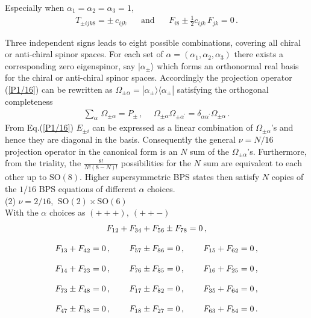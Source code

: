 \documentclass[a4paper,11pt]{article}
\begin{document}
Especially when $\alpha_{1}=\alpha_{2}=\alpha_{3}=1$,
\begin{equation}
\begin{array}{ccc}
T_{\pm ijk8}=\pm\,c_{ijk}~~~&~\mbox{and}~&~~~F_{i8}\pm\frac{1}{2}c_{ijk}\,F_{jk}=0\,.
\end{array}
\label{+++oct}
\end{equation}


Three independent signs leads to eight possible combinations, covering all chiral or anti-chiral spinor  spaces. For each set of
$\alpha=(\alpha_{1},\alpha_{2},\alpha_{3})$ there exists a corresponding zero eigenspinor, say $|\alpha_{\pm}\rangle$ which forms an orthonormal real
basis for the chiral or anti-chiral spinor spaces. Accordingly  the projection operator (\ref{P1/16})  can be rewritten as
$\Omega_{\pm\alpha}=|\alpha_{\pm}\rangle\langle\alpha_{\pm}|$ satisfying the orthogonal completeness
\begin{equation}
\begin{array}{cc}
\displaystyle{\sum_{\alpha}}\,\Omega_{\pm\alpha}=P_{\pm}\,,~&~
\Omega_{\pm\alpha}\Omega_{\pm\alpha^{\prime}}=\delta_{\alpha\alpha^{\prime}}\Omega_{\pm\alpha}\,.
\end{array}
\end{equation}
From Eq.(\ref{P1/16})  $E_{\pm i}$ can be expressed as a linear combination of $\Omega_{\pm\alpha}$'s and hence they are  diagonal in the basis.
Consequently the general $\nu={N/16}$ projection operator in the canonical form is an $N$ sum of the $\Omega_{\pm\alpha}$'s.  Furthermore, from the
triality,  the $\frac{8!}{N!(8-N)!}$ possibilities for the $N$ sum are equivalent to each other up to $\mbox{SO}(8)$. Higher supersymmetric BPS
states then satisfy $N$ copies of the ${1/16}$ BPS equations of different $\alpha$ choices.\\


(2) $\nu={2/16}$,  $~\mbox{SO}(2)\times\mbox{SO}(6)$\\
With the $\alpha$ choices as  $(+++),~(++-)$
\begin{equation}
\begin{array}{lll}
\multicolumn{3}{c}{F_{12}+F_{34}+F_{56}\pm F_{78}=0\,,}\\
{}&{}&{}\\
F_{13}+F_{42}=0\,,~~&~~F_{57}\pm F_{86}=0\,,~~&~~F_{15}+F_{62}=0\,,\\
{}&{}&{}\\
F_{14}+F_{23}=0\,,~~&~~F_{76}\pm F_{85}=0\,,~~&~~F_{16}+F_{25}=0\,,\\
{}&{}&{}\\
F_{73}\pm F_{48}=0\,,~~&~~F_{17}\pm F_{82}=0\,,~~&~~F_{35}+F_{64}=0\,,\\
{}&{}&{}\\
F_{47}\pm F_{38}=0\,,~~&~~F_{18}\pm F_{27}=0\,,~~&~~F_{63}+F_{54}=0\,.
\end{array}
\label{2/16}
\end{equation}
\end{document}
